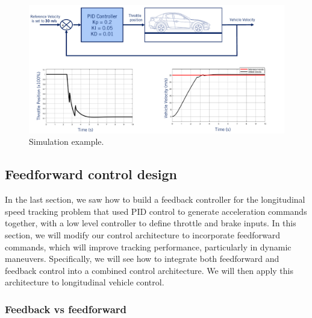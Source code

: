 \begin{figure}[!htb]
\begin{center}
\includegraphics[scale=0.380]{img/longitudinal_control/simulation_example.jpeg}
\end{center}
\caption{Simulation example.}
\label{simulation_example}
\end{figure}


\subsection{Feedforward control design}
\label{feedforward_control_design}

In the last section, we saw how to build
a feedback controller for the longitudinal speed tracking problem that used PID
control to generate acceleration commands together, with a low level controller
to define throttle and brake inputs. In this section, we will modify our control architecture
to incorporate feedforward commands, which will improve tracking performance,
particularly in dynamic maneuvers. Specifically, we will see how to
integrate both feedforward and feedback control into a combined
control architecture. We will then apply this architecture
to longitudinal vehicle control. 

\subsubsection{Feedback vs feedforward}

